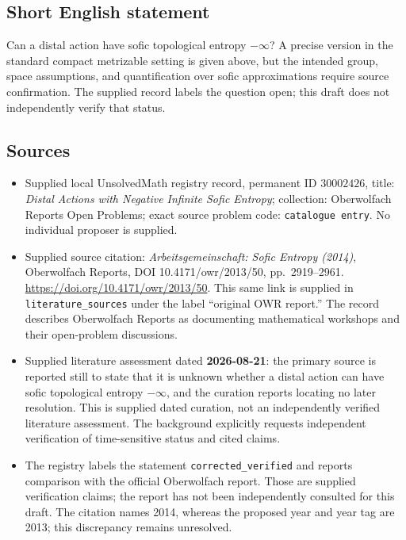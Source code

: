 \documentclass[11pt]{article}
\begin{document}
\subsection{Short English statement}
Can a distal action have sofic topological entropy \(-\infty\)? A precise version in the standard compact metrizable setting is given above, but the intended group, space assumptions, and quantification over sofic approximations require source confirmation. The supplied record labels the question open; this draft does not independently verify that status.
\subsection{Sources}
\begin{itemize}
\item Supplied local UnsolvedMath registry record, permanent ID \(30002426\), title: \emph{Distal Actions with Negative Infinite Sofic Entropy}; collection: Oberwolfach Reports Open Problems; exact source problem code: \texttt{catalogue entry}. No individual proposer is supplied.
\item Supplied source citation: \emph{Arbeitsgemeinschaft: Sofic Entropy (2014)}, Oberwolfach Reports, DOI 10.4171/owr/2013/50, pp.~2919--2961. \url{https://doi.org/10.4171/owr/2013/50}. This same link is supplied in \texttt{literature\_sources} under the label ``original OWR report.'' The record describes Oberwolfach Reports as documenting mathematical workshops and their open-problem discussions.
\item Supplied literature assessment dated \textbf{2026-08-21}: the primary source is reported still to state that it is unknown whether a distal action can have sofic topological entropy \(-\infty\), and the curation reports locating no later resolution. This is supplied dated curation, not an independently verified literature assessment. The background explicitly requests independent verification of time-sensitive status and cited claims.
\item The registry labels the statement \texttt{corrected\_verified} and reports comparison with the official Oberwolfach report. Those are supplied verification claims; the report has not been independently consulted for this draft. The citation names 2014, whereas the proposed year and year tag are 2013; this discrepancy remains unresolved.
\end{itemize}
\end{document}
